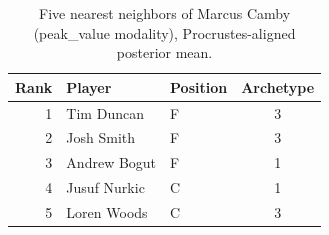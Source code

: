 \begin{table}[htbp]
  \centering\small
  \begin{tabular}{rllc}
    \toprule
    Rank & Player & Position & Archetype \\
    \midrule
    1 & Tim Duncan & F & 3 \\
    2 & Josh Smith & F & 3 \\
    3 & Andrew Bogut & F & 1 \\
    4 & Jusuf Nurkic & C & 1 \\
    5 & Loren Woods & C & 3 \\
    \bottomrule
  \end{tabular}
  \caption{Five nearest neighbors of Marcus Camby (peak_value modality), Procrustes-aligned posterior mean.}
  \label{tab:Marcus_Camby_neighbors_peak_value}
\end{table}

